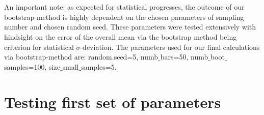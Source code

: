 \documentclass[11pt, letterpaper, onecolumn]{article}
\begin{document}
	\\
	\\
	An important note: as expected for statistical progresses, the outcome of our bootstrap-method is highly dependent on the chosen parameters of sampling number and chosen random seed. These parameters were tested extensively with hindsight on the error of the overall mean via the bootstrap method being criterion for statistical $\sigma$-deviation. The parameters used for our final calculations via bootstrap-method are: random.seed=5, numb$\_$bars=50, numb$\_$boot$\_$samples=100, size$\_$small$\_$samples=5.
	




	\section{Testing first set of parameters}
	
\end{document}
